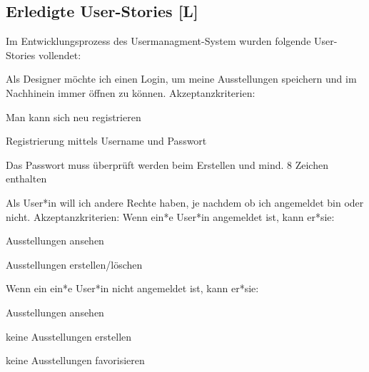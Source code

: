 \subsection{Erledigte User-Stories [L]}
Im Entwicklungsprozess des Usermanagment-System wurden folgende User-Stories vollendet: 
\begin{compactenum}
  \item Als Designer möchte ich einen Login, um meine Ausstellungen speichern und im Nachhinein immer öffnen zu können.
  Akzeptanzkriterien:
  \begin{compactitem}
      \item Man kann sich neu registrieren
      \item Registrierung mittels Username und Passwort
      \item Das Passwort muss überprüft werden beim Erstellen und mind. 8 Zeichen enthalten
  \end{compactitem}
  \item Als User*in will ich andere Rechte haben, je nachdem ob ich angemeldet bin oder nicht. Akzeptanzkriterien:
  Wenn ein*e User*in angemeldet ist, kann er*sie:
      \begin{compactitem}
          \item Ausstellungen ansehen
          \item Ausstellungen erstellen/löschen
      \end{compactitem}  
  Wenn ein ein*e User*in nicht angemeldet ist, kann er*sie:
      \begin{compactitem}
          \item Ausstellungen ansehen
          \item keine Ausstellungen erstellen
          \item keine Ausstellungen favorisieren
      \end{compactitem} 
\end{compactenum}